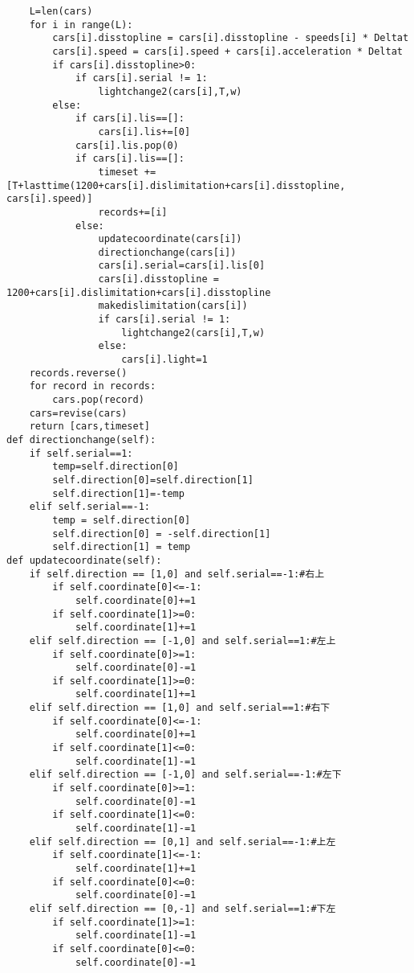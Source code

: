 \documentclass[a4paper,12pt]{article}
\numberwithin{equation}{section}
\begin{document}
\begin{appendix}
\begin{lstlisting}
    L=len(cars)
    for i in range(L):
        cars[i].disstopline = cars[i].disstopline - speeds[i] * Deltat
        cars[i].speed = cars[i].speed + cars[i].acceleration * Deltat
        if cars[i].disstopline>0:
            if cars[i].serial != 1:
                lightchange2(cars[i],T,w)
        else:
            if cars[i].lis==[]:
                cars[i].lis+=[0]
            cars[i].lis.pop(0)
            if cars[i].lis==[]:
                timeset += [T+lasttime(1200+cars[i].dislimitation+cars[i].disstopline, cars[i].speed)]
                records+=[i]
            else:
                updatecoordinate(cars[i])
                directionchange(cars[i])
                cars[i].serial=cars[i].lis[0]
                cars[i].disstopline = 1200+cars[i].dislimitation+cars[i].disstopline
                makedislimitation(cars[i])
                if cars[i].serial != 1:
                    lightchange2(cars[i],T,w)
                else:
                    cars[i].light=1
    records.reverse()
    for record in records:
        cars.pop(record)
    cars=revise(cars)
    return [cars,timeset]
def directionchange(self):
    if self.serial==1:
        temp=self.direction[0]
        self.direction[0]=self.direction[1]
        self.direction[1]=-temp
    elif self.serial==-1:
        temp = self.direction[0]
        self.direction[0] = -self.direction[1]
        self.direction[1] = temp
def updatecoordinate(self):
    if self.direction == [1,0] and self.serial==-1:#右上
        if self.coordinate[0]<=-1:
            self.coordinate[0]+=1
        if self.coordinate[1]>=0:
            self.coordinate[1]+=1
    elif self.direction == [-1,0] and self.serial==1:#左上
        if self.coordinate[0]>=1:
            self.coordinate[0]-=1
        if self.coordinate[1]>=0:
            self.coordinate[1]+=1
    elif self.direction == [1,0] and self.serial==1:#右下
        if self.coordinate[0]<=-1:
            self.coordinate[0]+=1
        if self.coordinate[1]<=0:
            self.coordinate[1]-=1
    elif self.direction == [-1,0] and self.serial==-1:#左下
        if self.coordinate[0]>=1:
            self.coordinate[0]-=1
        if self.coordinate[1]<=0:
            self.coordinate[1]-=1
    elif self.direction == [0,1] and self.serial==-1:#上左
        if self.coordinate[1]<=-1:
            self.coordinate[1]+=1
        if self.coordinate[0]<=0:
            self.coordinate[0]-=1
    elif self.direction == [0,-1] and self.serial==1:#下左
        if self.coordinate[1]>=1:
            self.coordinate[1]-=1
        if self.coordinate[0]<=0:
            self.coordinate[0]-=1

\end{lstlisting}
\end{appendix}
\end{document}
